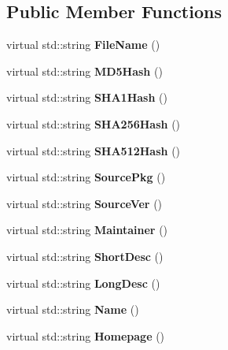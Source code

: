\subsection*{\-Public \-Member \-Functions}
\begin{DoxyCompactItemize}
\item 
virtual std\-::string {\bfseries \-File\-Name} ()\label{classdebRecordParser_a452df6640c5fc6b2a6e165aa6c051686}

\item 
virtual std\-::string {\bfseries \-M\-D5\-Hash} ()\label{classdebRecordParser_aa5a1ea13bdce365b812fcc6e522ece0d}

\item 
virtual std\-::string {\bfseries \-S\-H\-A1\-Hash} ()\label{classdebRecordParser_a34d9edd91e176ce16097b1a6568a8c8d}

\item 
virtual std\-::string {\bfseries \-S\-H\-A256\-Hash} ()\label{classdebRecordParser_acbde5bde99bd4aca01dd0956a412b0b8}

\item 
virtual std\-::string {\bfseries \-S\-H\-A512\-Hash} ()\label{classdebRecordParser_a9a8334e8d3cf9105dd5e3ca95f3b01f7}

\item 
virtual std\-::string {\bfseries \-Source\-Pkg} ()\label{classdebRecordParser_ad6d3bbb08e7eba14d889d64e0a2bb24a}

\item 
virtual std\-::string {\bfseries \-Source\-Ver} ()\label{classdebRecordParser_af282840bf5a9fb348b1bd949c1cd5a7f}

\item 
virtual std\-::string {\bfseries \-Maintainer} ()\label{classdebRecordParser_af1a13f9a791540d9ef9008cdfd293d7f}

\item 
virtual std\-::string {\bfseries \-Short\-Desc} ()\label{classdebRecordParser_aaf0cf9583a4eeb90de26a9374d45bec3}

\item 
virtual std\-::string {\bfseries \-Long\-Desc} ()\label{classdebRecordParser_a4a2656af9e156c4402a36b2bd9258a0c}

\item 
virtual std\-::string {\bfseries \-Name} ()\label{classdebRecordParser_a26f76217e5014e355033cfe094fcc168}

\item 
virtual std\-::string {\bfseries \-Homepage} ()\label{classdebRecordParser_a7fb9ada584236fc5237840c2bdbcb84d}


\end{DoxyCompactItemize}
